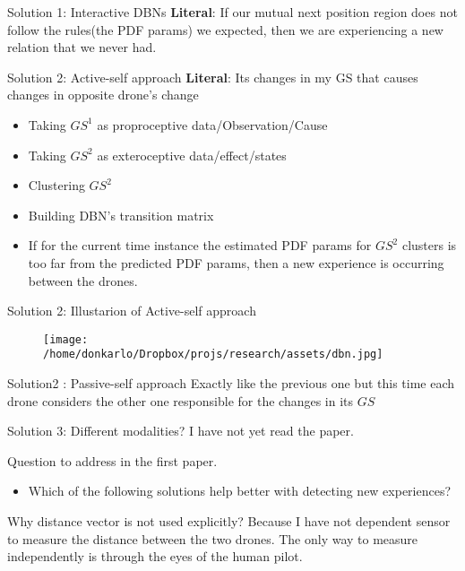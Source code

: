 \documentclass[unknownkeysallowed]{beamer}
\begin{document}
	\begin{frame}{Solution 1: Interactive DBNs}
		\textbf{Literal}: If our mutual next position region does not follow the rules(the PDF params) we expected, then we are experiencing a new relation that we never had.
	\end{frame}

	\begin{frame}{Solution 2: Active-self approach}
		\textbf{Literal}: Its changes in my GS that causes changes in opposite drone's change
		\begin{itemize}
			\item Taking \textbf{$GS^1$} as proproceptive data/Observation/Cause
			\item Taking $GS^2$ as exteroceptive data/effect/states
			\item Clustering $GS^2$
			\item Building DBN's transition matrix
			\item If for the current time instance the estimated PDF params for $GS^2$ clusters is too far from the predicted PDF params, then a new experience is occurring between the drones.
		\end{itemize}
	\end{frame}

	\begin{frame}{Solution 2: Illustarion of Active-self approach}
		\begin{figure}
			\texttt{[image: /home/donkarlo/Dropbox/projs/research/assets/dbn.jpg]}
		\end{figure}
	\end{frame}

	\begin{frame}{Solution2 : Passive-self approach}
		Exactly like the previous one but this time each drone considers the other one responsible for the changes in its $GS$
	\end{frame}

	\begin{frame}{Solution 3: Different modalities?}
		I have not yet read the paper. 
	\end{frame}

	\begin{frame}{}
		Question to address in the first paper. 
		\begin{itemize}
			\item Which of the following solutions help better with detecting new experiences?
		\end{itemize}
	\end{frame}

	\begin{frame}{Why distance vector is not used explicitly?}
		Because I have not dependent sensor to measure the distance between the two drones.
		The only way to measure independently is through the eyes of the human pilot.   
	\end{frame}
\end{document}
